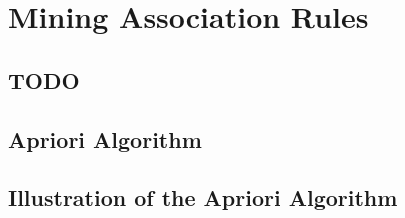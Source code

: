 \section{Mining Association Rules}
\label{sec:mining_association_rules}

  \subsection{TODO}
  \label{subsec:TODO}

  \subsection{Apriori Algorithm}
  \label{subsec:apriori_algorithm}

  \subsection{Illustration of the Apriori Algorithm}
  \label{subsec:illustration_of_the_apriori_algorithm}

